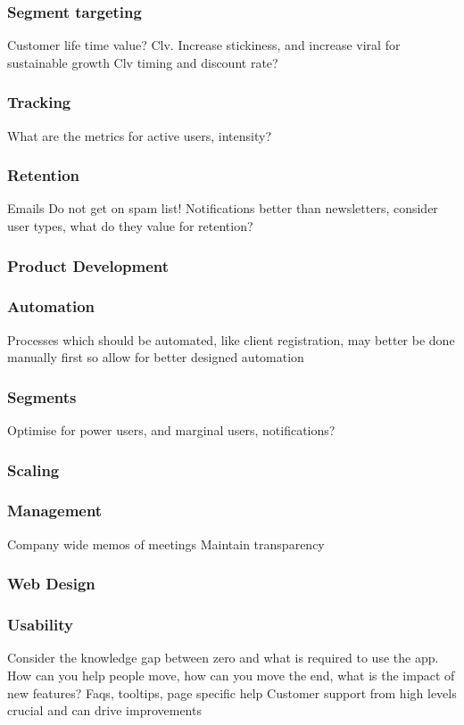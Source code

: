 \subsubsection{Segment targeting}
Customer life time value? Clv. Increase stickiness, and increase viral for sustainable growth
Clv timing and discount rate?

\subsubsection{Tracking}
What are the metrics for active users, intensity?

\subsubsection{Retention}
Emails
Do not get on spam list! Notifications better than newsletters, consider user types, what do they value for retention?

\subsubsection{Product Development}
\subsubsection{Automation}
Processes which should be automated, like client registration, may better be done manually first so allow for better designed automation

\subsubsection{Segments}
Optimise for power users, and marginal users, notifications?

\subsubsection{Scaling}
\subsubsection{Management}
Company wide memos of meetings
Maintain transparency
\subsubsection{Web Design}
\subsubsection{Usability}
Consider the knowledge gap between zero and what is required to use the app. How can you help people move, how can you move the end, what is the impact of new features?
Faqs, tooltips, page specific help
Customer support from high levels crucial and can drive improvements


